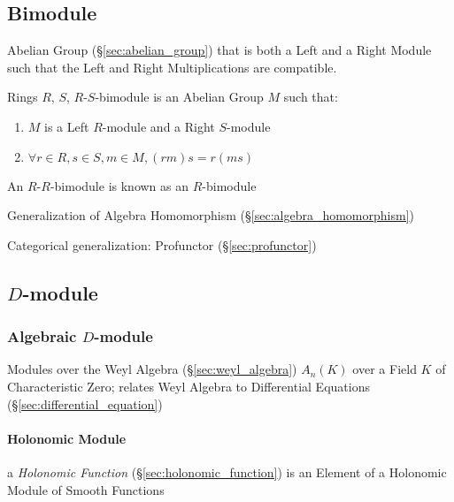 \subsection{Bimodule}\label{sec:bimodule}

Abelian Group (\S\ref{sec:abelian_group}) that is both a Left and a
Right Module such that the Left and Right Multiplications are
compatible.

Rings $R$, $S$, $R$-$S$-bimodule is an Abelian Group $M$ such that:

\begin{enumerate}
\item $M$ is a Left $R$-module and a Right $S$-module
\item $\forall r \in R, s \in S, m \in M, (rm)s = r(ms)$
\end{enumerate}

An $R$-$R$-bimodule is known as an $R$-bimodule

Generalization of Algebra Homomorphism
(\S\ref{sec:algebra_homomorphism})

Categorical generalization: Profunctor (\S\ref{sec:profunctor})



\subsection{$D$-module}\label{sec:d_module}

\subsubsection{Algebraic $D$-module}\label{sec:algebraic_d_module}

Modules over the Weyl Algebra (\S\ref{sec:weyl_algebra}) $A_n(K)$ over a Field
$K$ of Characteristic Zero; relates Weyl Algebra to Differential Equations
(\S\ref{sec:differential_equation})



\paragraph{Holonomic Module}\label{sec:holonomic_modules}\hfill

a \emph{Holonomic Function} (\S\ref{sec:holonomic_function}) is an Element of a
Holonomic Module of Smooth Functions

